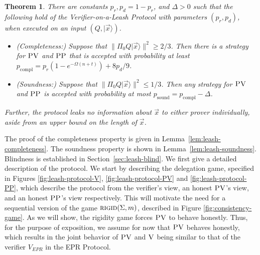 \documentclass[11pt,letter]{article}
\newtheorem{theorem}{Theorem}
\theoremstyle{remark}
\theoremstyle{definition}
\newcommand{\ket}[1]{|#1\rangle}
\newcommand{\rigid}{\textsc{rigid}}
\newcommand{\ver}{\textsc{V}}
\newcommand{\pv}{\textsc{PV}}
\newcommand{\pp}{\textsc{PP}}
\begin{document}
\begin{theorem}\label{thm:leash}
There are constants $p_r,p_d=1-p_r$, and $\Delta>0$ such that the following hold of the Verifier-on-a-Leash Protocol with parameters $(p_r,p_d)$, when executed on an input $(Q,\ket{\vec{x}})$.
\begin{itemize}
\item \emph{(Completeness:)} Suppose that $\|\Pi_0 Q\ket{\vec{x}}\|^2 \geq 2/3$. Then there is a strategy for $\pv$ and $\pp$ that is accepted with probability at least $p_{\mathrm{compl}} = p_r(1-e^{-\Omega(n+t)})+8p_d/9$. 
\item \emph{(Soundness:)} Suppose that $\|\Pi_0 Q\ket{\vec{x}}\|^2 \leq 1/3$. Then any strategy for $\pv$ and $\pp$ is accepted with probability at most $p_{\mathrm{sound}} = p_{\mathrm{compl}} - \Delta$. 
\end{itemize}
Further, the protocol leaks no information about $\vec{x}$ to either prover individually, aside from an upper bound on the length of $\vec{x}$. 
\end{theorem}



The proof of the completeness property is given in Lemma~\ref{lem:leash-completeness}. The soundness property is shown in Lemma~\ref{lem:leash-soundness}. Blindness is established in Section~\ref{sec:leash-blind}. 
We first give a detailed description of the protocol. We start by describing the delegation game, specified in Figures \ref{fig:leash-protocol-V}, \ref{fig:leash-protocol-PV} and \ref{fig:leash-protocol-PP}, which describe the protocol from the verifier's view, an honest $\pv$'s view, and an honest $\pp$'s view respectively. This will motivate the need for a sequential version of the game $\rigid(\Sigma,m)$, described in Figure \ref{fig:consistency-game}. As we will show, the rigidity game forces $\pv$ to behave honestly. Thus, for the purpose of exposition, we assume for now that $\pv$ behaves honestly, which results in the joint behavior of $\pv$ and $\ver$ being similar to that of the verifier $V_{EPR}$ in the EPR Protocol. 
\end{document}
